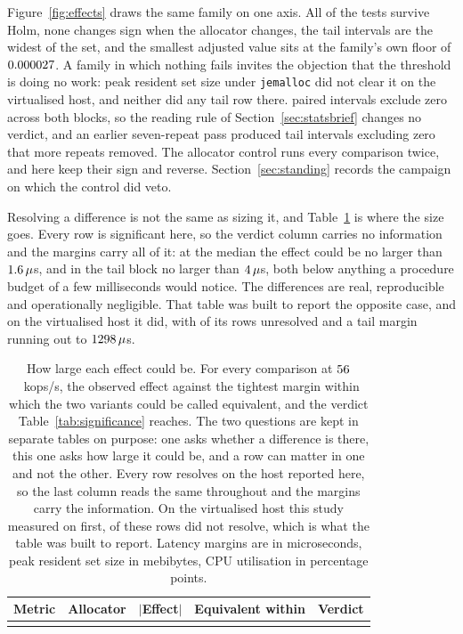 \documentclass[english,oneside,a4paper,censored,csm,software-track-2020]{HYthesisML}
\begin{document}
Figure~\ref{fig:effects} draws the same family on one axis. All \NSignificant{} of the \NTests{}
tests survive Holm, none changes sign when the allocator changes, the tail intervals are the
widest of the set, and the smallest adjusted value sits at the family's own floor of
$0.000027$. A family in which nothing fails invites the objection that the threshold is
doing no work: peak resident set size under \texttt{jemalloc} did not clear it on the virtualised
host, and neither did any tail row there. \NExclZero{} paired intervals exclude zero across both
blocks, so the reading rule of Section~\ref{sec:statsbrief} changes no verdict, and an earlier
seven-repeat pass produced tail intervals excluding zero that more repeats removed. The allocator
control runs every comparison twice, and here \CrossAllocConsistent{} keep their sign and
\NCrossAllocReversed{} reverse. Section~\ref{sec:standing} records the campaign on which the
control did veto.

Resolving a difference is not the same as sizing it, and Table~\ref{tab:equivalence} is where the
size goes. Every row is significant here, so the verdict column carries no information and the
margins carry all of it: at the median the effect could be no larger than
$1.6\,\mu$s, and in the tail block no larger than $4\,\mu$s, both
below anything a procedure budget of a few milliseconds would notice. The differences are real,
reproducible and operationally negligible. That table was built to report the opposite case, and
on the virtualised host it did, with \GuestNEqvUnresolved{} of its \GuestNEqvRows{} rows
unresolved and a tail margin running out to $1298\,\mu$s.

\begin{table}[tp]
\centering
\small
\caption[How large each effect could be]{How large each effect could be. For every comparison at
$56$~kops/s, the observed effect against the tightest margin within which the two variants
could be called equivalent, and the verdict Table~\ref{tab:significance} reaches. The two
questions are kept in separate tables on purpose: one asks whether a difference is there, this
one asks how large it could be, and a row can matter in one and not the other. Every row resolves
on the host reported here, so the last column reads the same throughout and the margins carry the
information. On the virtualised host this study measured on first,
\GuestNEqvUnresolved{} of these rows did not resolve, which is what the table was built to
report. Latency margins are in microseconds, peak resident set size in mebibytes, CPU utilisation
in percentage points.\label{tab:equivalence}}
\begin{tabular}{@{}l l r r l@{}}
\hline\hline
Metric & Allocator & $|$Effect$|$ & Equivalent within & Verdict \\
\hline
\\
\hline
\end{tabular}
\end{table}
\end{document}
